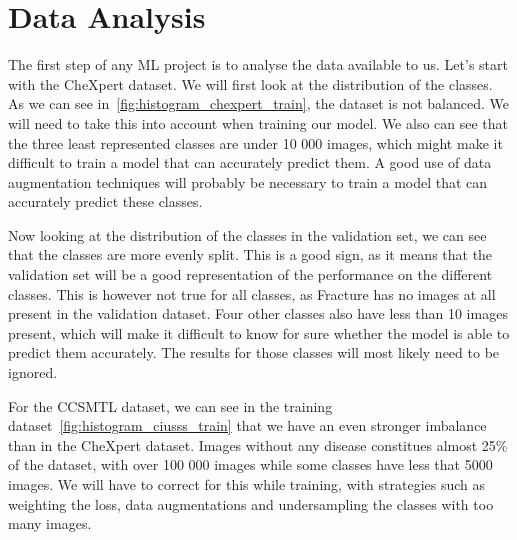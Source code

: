 \documentclass[11pt]{article}
\begin{document}
    \section{Data Analysis}

    The first step of any ML project is to analyse the data available to us. Let's start with the CheXpert dataset.
    We will first look at the distribution of the classes. As we can see
    in~\ref{fig:histogram_chexpert_train}, the dataset is not balanced. We will need to take this into account when
    training our model. We also can see that the three least represented classes are under 10 000 images, which might
    make it difficult to train a model that can accurately predict them. A good use of data augmentation techniques
    will probably be necessary to train a model that can accurately predict these classes.

    Now looking at the distribution of the classes in the validation set, we can see that the classes are more evenly
    split. This is a good sign, as it means that the validation set will be a good representation of the performance
    on the different classes. This is however not true for all classes, as Fracture has no images at all present in
    the validation dataset. Four other classes also have less than 10 images present, which will make it difficult to
    know for sure whether the model is able to predict them accurately. The results for those classes will most
    likely need to be ignored.

    For the CCSMTL dataset, we can see in the training dataset~\ref{fig:histogram_ciusss_train} that we have an even stronger imbalance than in the
    CheXpert dataset. Images without any disease constitues almost 25\% of the dataset, with over 100 000 images
    while some classes have less that 5000 images. We will have to correct for this while training, with strategies
    such as weighting the loss, data augmentations and undersampling the classes with too many images.
\end{document}
